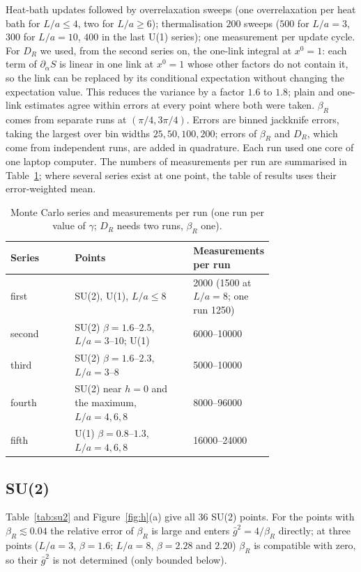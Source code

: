 \documentclass[11pt,a4paper]{article}
\theoremstyle{definition}
\theoremstyle{remark}
\newcommand{\gb}{\bar g^{2}}
\newcommand{\bR}{\beta_R}
\newcommand{\DR}{D_R}
\begin{document}
Heat-bath updates followed by overrelaxation sweeps (one overrelaxation per heat bath for $L/a\le4$, two for $L/a\ge6$); thermalisation $200$ sweeps ($500$ for $L/a=3$, $300$ for $L/a=10$, $400$ in the last U(1) series); one measurement per update cycle. For $\DR$ we used, from the second series on, the one-link integral at $x^0=1$: each term of $\partial_\alpha S$ is linear in one link at $x^0=1$ whose other factors do not contain it, so the link can be replaced by its conditional expectation without changing the expectation value. This reduces the variance by a factor $1.6$ to $1.8$; plain and one-link estimates agree within errors at every point where both were taken. $\bR$ comes from separate runs at $(\pi/4,3\pi/4)$. Errors are binned jackknife errors, taking the largest over bin widths $25,50,100,200$; errors of $\bR$ and $\DR$, which come from independent runs, are added in quadrature. Each run used one core of one laptop computer. The numbers of measurements per run are summarised in Table~\ref{tab:stats}; where several series exist at one point, the table of results uses their error-weighted mean.

\begin{table}[ht]\centering\small
\caption{Monte Carlo series and measurements per run (one run per value of $\gamma$; $\DR$ needs two runs, $\bR$ one).}\label{tab:stats}
\begin{tabular}{@{}lp{0.45\linewidth}p{0.30\linewidth}@{}}\toprule
Series & Points & Measurements per run\\\midrule
first & SU(2), U(1), $L/a\le8$ & 2000 (1500 at $L/a=8$; one run 1250)\\
second & SU(2) $\beta=1.6$--$2.5$, $L/a=3$--$10$; U(1) & 6000--10000\\
third & SU(2) $\beta=1.6$--$2.3$, $L/a=3$--$8$ & 5000--10000\\
fourth & SU(2) near $h=0$ and the maximum, $L/a=4,6,8$ & 8000--96000\\
fifth & U(1) $\beta=0.8$--$1.3$, $L/a=4,6,8$ & 16000--24000\\\bottomrule
\end{tabular}
\end{table}

\subsection{SU(2)}

Table~\ref{tab:su2} and Figure~\ref{fig:h}(a) give all 36 SU(2) points. For the points with $\bR\lesssim0.04$ the relative error of $\bR$ is large and enters $\gb=4/\bR$ directly; at three points ($L/a=3$, $\beta=1.6$; $L/a=8$, $\beta=2.28$ and $2.20$) $\bR$ is compatible with zero, so their $\gb$ is not determined (only bounded below).
\end{document}
